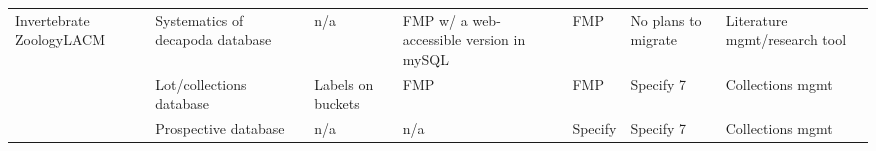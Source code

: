 \begin{table*}[t]
{\begin{tabular}{lllllll}
\multirow{3}{*}{Invertebrate ZoologyLACM}                & Systematics of decapoda database             & n/a                      & FMP w/ a web-accessible version in mySQL & FMP                                  & No plans to migrate         & Literature mgmt/research tool               \\
                                                         & Lot/collections database                     & Labels on buckets        & FMP                                      & FMP                                  & Specify 7                   & Collections mgmt                            \\
                                                         & Prospective database                         & n/a                      & n/a                                      & Specify                              & Specify 7                   & Collections mgmt                           
\end{tabular}
}
\end{table*}